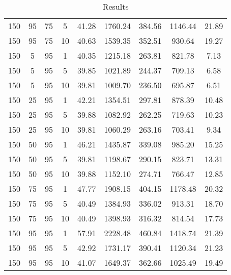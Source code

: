 \begin{table}[h]
\begin{tabular}{cccc|c|c|c|c|c}
150 & 95 & 75 & 5 & \cellcolor{gray!36}41.28 & \cellcolor{gray!1}1760.24 & \cellcolor{gray!1}384.56 & \cellcolor{gray!1}1146.44 & 21.89\\
150 & 95 & 75 & 10 & \cellcolor{gray!42}40.63 & \cellcolor{gray!1}1539.35 & \cellcolor{gray!1}352.51 & \cellcolor{gray!1}930.64 & 19.27\\
150 & 5 & 95 & 1 & \cellcolor{gray!45}40.35 & \cellcolor{gray!1}1215.18 & \cellcolor{gray!19}263.81 & \cellcolor{gray!5}821.78 & 7.13\\
150 & 5 & 95 & 5 & \cellcolor{gray!50}39.85 & \cellcolor{gray!33}1021.89 & \cellcolor{gray!41}244.37 & \cellcolor{gray!41}709.13 & 6.58\\
150 & 5 & 95 & 10 & \cellcolor{gray!50}39.81 & \cellcolor{gray!35}1009.70 & \cellcolor{gray!50}236.50 & \cellcolor{gray!45}695.87 & 6.51\\
150 & 25 & 95 & 1 & \cellcolor{gray!26}42.21 & \cellcolor{gray!1}1354.51 & \cellcolor{gray!1}297.81 & \cellcolor{gray!1}878.39 & 10.48\\
150 & 25 & 95 & 5 & \cellcolor{gray!50}39.88 & \cellcolor{gray!22}1082.92 & \cellcolor{gray!21}262.25 & \cellcolor{gray!37}719.63 & 10.23\\
150 & 25 & 95 & 10 & \cellcolor{gray!50}39.81 & \cellcolor{gray!26}1060.29 & \cellcolor{gray!20}263.16 & \cellcolor{gray!42}703.41 & 9.34\\
150 & 50 & 95 & 1 & \cellcolor{gray!1}46.21 & \cellcolor{gray!1}1435.87 & \cellcolor{gray!1}339.08 & \cellcolor{gray!1}985.20 & 15.25\\
150 & 50 & 95 & 5 & \cellcolor{gray!50}39.81 & \cellcolor{gray!1}1198.67 & \cellcolor{gray!1}290.15 & \cellcolor{gray!5}823.71 & 13.31\\
150 & 50 & 95 & 10 & \cellcolor{gray!50}39.88 & \cellcolor{gray!9}1152.10 & \cellcolor{gray!7}274.71 & \cellcolor{gray!23}766.47 & 12.85\\
150 & 75 & 95 & 1 & \cellcolor{gray!1}47.77 & \cellcolor{gray!1}1908.15 & \cellcolor{gray!1}404.15 & \cellcolor{gray!1}1178.48 & 20.32\\
150 & 75 & 95 & 5 & \cellcolor{gray!44}40.49 & \cellcolor{gray!1}1384.93 & \cellcolor{gray!1}336.02 & \cellcolor{gray!1}913.31 & 18.70\\
150 & 75 & 95 & 10 & \cellcolor{gray!44}40.49 & \cellcolor{gray!1}1398.93 & \cellcolor{gray!1}316.32 & \cellcolor{gray!8}814.54 & 17.73\\
150 & 95 & 95 & 1 & \cellcolor{gray!1}57.91 & \cellcolor{gray!1}2228.48 & \cellcolor{gray!1}460.84 & \cellcolor{gray!1}1418.74 & 21.39\\
150 & 95 & 95 & 5 & \cellcolor{gray!19}42.92 & \cellcolor{gray!1}1731.17 & \cellcolor{gray!1}390.41 & \cellcolor{gray!1}1120.34 & 21.23\\
150 & 95 & 95 & 10 & \cellcolor{gray!38}41.07 & \cellcolor{gray!1}1649.37 & \cellcolor{gray!1}362.66 & \cellcolor{gray!1}1025.49 & 19.49
\end{tabular}
\caption{Results}
\label{tab:res1}
\end{table}